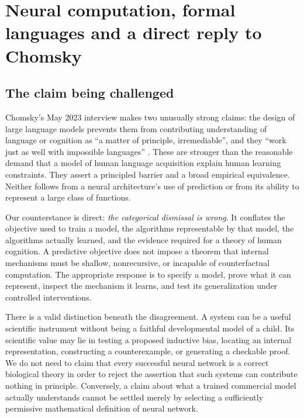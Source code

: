 \chapter{Neural computation, formal languages and a direct reply to Chomsky}
\label{ch:learning-languages}

\section{The claim being challenged}

Chomsky's May 2023 interview makes two unusually strong claims: the design of large language models prevents them from contributing understanding of language or cognition as ``a matter of principle, irremediable'', and they ``work just as well with impossible languages'' \cite{LLchomskyMay}. These are stronger than the reasonable demand that a model of human language acquisition explain human learning constraints. They assert a principled barrier and a broad empirical equivalence. Neither follows from a neural architecture's use of prediction or from its ability to represent a large class of functions.

Our counterstance is direct: \emph{the categorical dismissal is wrong}. It conflates the objective used to train a model, the algorithms representable by that model, the algorithms actually learned, and the evidence required for a theory of human cognition. A predictive objective does not impose a theorem that internal mechanisms must be shallow, nonrecursive, or incapable of counterfactual computation. The appropriate response is to specify a model, prove what it can represent, inspect the mechanism it learns, and test its generalization under controlled interventions.

There is a valid distinction beneath the disagreement. A system can be a useful scientific instrument without being a faithful developmental model of a child. Its scientific value may lie in testing a proposed inductive bias, locating an internal representation, constructing a counterexample, or generating a checkable proof. We do not need to claim that every successful neural network is a correct biological theory in order to reject the assertion that such systems can contribute nothing in principle. Conversely, a claim about what a trained commercial model actually understands cannot be settled merely by selecting a sufficiently permissive mathematical definition of neural network.

